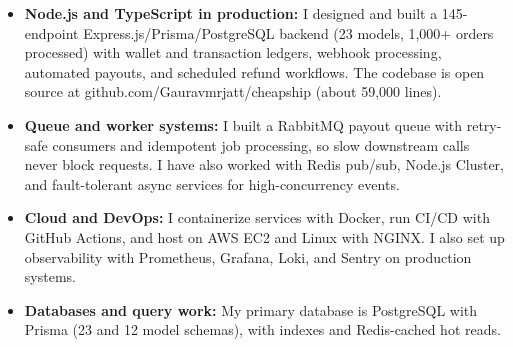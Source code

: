 \documentclass[]{cover}
\begin{document}


\currentdate{\today}


{\raggedright{}\fontsize{11pt}{13pt}\selectfont
\renewcommand{\labelitemi}{\textbullet}
\renewcommand{\labelitemii}{\textbullet}
\renewcommand{\labelitemiii}{\textbullet}
\begin{itemize}
    \item \textbf{Node.js and TypeScript in production:} I designed and built a 145-endpoint Express.js/Prisma/PostgreSQL backend (23 models, 1,000+ orders processed) with wallet and transaction ledgers, webhook processing, automated payouts, and scheduled refund workflows. The codebase is open source at github.com/Gauravmrjatt/cheapship (about 59,000 lines).
    \item \textbf{Queue and worker systems:} I built a RabbitMQ payout queue with retry-safe consumers and idempotent job processing, so slow downstream calls never block requests. I have also worked with Redis pub/sub, Node.js Cluster, and fault-tolerant async services for high-concurrency events.
    \item \textbf{Cloud and DevOps:} I containerize services with Docker, run CI/CD with GitHub Actions, and host on AWS EC2 and Linux with NGINX. I also set up observability with Prometheus, Grafana, Loki, and Sentry on production systems.
    \item \textbf{Databases and query work:} My primary database is PostgreSQL with Prisma (23 and 12 model schemas), with indexes and Redis-cached hot reads.\end{itemize}\par}
\vspace{6pt}
\end{document}

